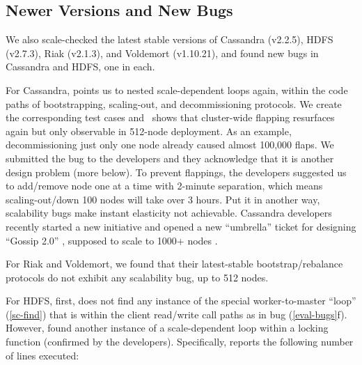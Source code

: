


\subsection{Newer Versions and New Bugs}
\label{eval-new}



We also scale-checked the latest stable versions of Cassandra (v2.2.5),
HDFS (v2.7.3), Riak (v2.1.3), and Voldemort (v1.10.21), and found new bugs
in Cassandra and HDFS, one in each.


For Cassandra, \sfind points us to nested scale-dependent loops again,
within the code paths of bootstrapping, scaling-out, and decommissioning
protocols.
%
We create the corresponding test cases and \sck\ shows that cluster-wide
flapping resurfaces again but only observable in 512-node deployment.
%
As an example, decommissioning just only one node already caused almost
100,000 flaps.  We submitted the bug to the developers and they 
acknowledge that it is another design problem (more below).
%
To prevent flappings, the developers suggested us to add/remove node one
at a time with 2-minute separation, which means scaling-out/down 100 nodes
will take over 3 hours.  Put it in another way, scalability bugs make
instant elasticity not achievable.
%
Cassandra developers recently started a new initiative and opened a new
``umbrella'' ticket for designing ``Gossip 2.0'' \cite{Gossip20}, supposed
to scale to
1000+ nodes \cite{Gossip20Mail}.
%
%


For Riak and Voldemort, we found that their latest-stable
bootstrap/rebalance protocols do not exhibit any scalability bug, up to
512 nodes.






For HDFS, first, \sfind does not find any instance of the special
worker-to-master ``loop'' (\sec\ref{sc-find}) that is within the client
read/write call paths as in bug \hdone (\sec\ref{eval-bugs}f).
%
%
%
%
However, \sfind found another instance of a scale-dependent loop within a
locking function (confirmed by the developers).  Specifically, \sfind
reports the following number of lines executed:

